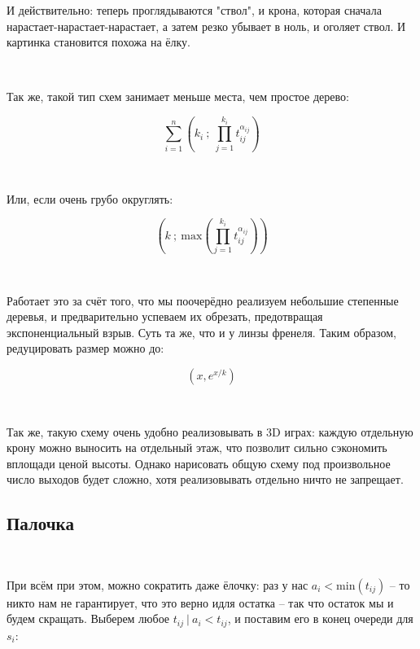 \vspace{0.5in}

И действительно: теперь проглядываются "ствол", и крона, которая сначала нарастает-нарастает-нарастает, а затем резко убывает в ноль, и оголяет ствол. И картинка становится похожа на ёлку. 

\

\noindent Так же, такой тип схем занимает меньше места, чем простое дерево: 

$$ 
\sum_{i=1}^{n} 
\left( 
k_i
\ ; \ 
\prod_{j=1}^{k_i} t_{ij}^{\alpha_{ij}} 
\right)
$$

\

\noindent Или, если очень грубо округлять:

$$
\left(
k
\ ; \ 
\text{max}\left(
	\prod_{j=1}^{k_i} t_{ij}^{\alpha_{ij}}
	\right)
\right)
$$

\

Работает это за счёт того, что мы поочерёдно реализуем небольшие степенные деревья, и предварительно успеваем их обрезать, предотвращая экспоненциальный взрыв. Суть та же, что и у линзы френеля. Таким образом, редуцировать размер можно до: 

$$\left(x, e^{x/k}\right)$$

\

Так же, такую схему очень удобно реализовывать в 3D играх: каждую отдельную крону можно выносить на отдельный этаж, что позволит сильно сэкономить вплощади ценой высоты. Однако нарисовать общую схему под произвольное число выходов будет сложно, хотя реализовывать отдельно ничто не запрещает.





















\vspace{1in}

\subsection{Палочка}

\

При всём при этом, можно сократить даже ёлочку: раз у нас $a_i < \text{min}(t_{ij})$ -- то никто нам не гарантирует, что это верно идля остатка -- так что остаток мы и будем скращать. Выберем любое $t_{ij} \ | \ a_i < t_{ij}$, и поставим его в конец очереди для $s_i$:





